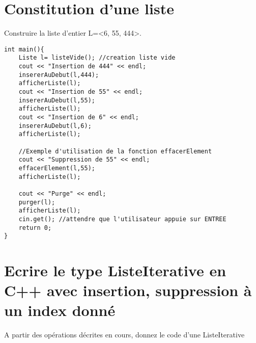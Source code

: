 \documentclass[french]{article}
\begin{document}
	\section{Constitution d’une liste}
	Construire la liste d’entier L=<6, 55, 444>.
	
	\begin{lstlisting}
int main(){
    Liste l= listeVide(); //creation liste vide
    cout << "Insertion de 444" << endl;
    insererAuDebut(l,444);
    afficherListe(l);
    cout << "Insertion de 55" << endl;
    insererAuDebut(l,55);
    afficherListe(l);
    cout << "Insertion de 6" << endl;
    insererAuDebut(l,6);
    afficherListe(l);
	
    //Exemple d'utilisation de la fonction effacerElement
    cout << "Suppression de 55" << endl;
    effacerElement(l,55);
    afficherListe(l);
    
    cout << "Purge" << endl;
    purger(l);
    afficherListe(l);
    cin.get(); //attendre que l'utilisateur appuie sur ENTREE
    return 0;	 
}
	\end{lstlisting}
	\section{Ecrire le type ListeIterative en C++ avec insertion, suppression à un index donné}
	A partir des opérations décrites en cours, donnez le code d’une ListeIterative
	
\end{document}
